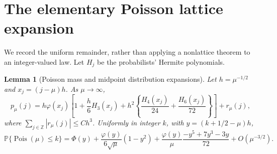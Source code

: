 \documentclass[11pt]{article}
\newcommand{\Pp}{\mathbb P}
\newcommand{\Pois}{\operatorname{Pois}}
\newtheorem{lemma}[theorem]{Lemma}
\theoremstyle{remark}
\begin{document}
\section{The elementary Poisson lattice expansion}\label{sec:lattice}
We record the uniform remainder, rather than applying a nonlattice theorem to an integer-valued law. Let $H_j$ be the probabilists' Hermite polynomials.
\begin{lemma}[Poisson mass and midpoint distribution expansions]\label{lem:poisson-lattice}
Let $h=\mu^{-1/2}$ and $x_j=(j-\mu)h$. As $\mu\to\infty$,
\begin{equation}\label{eq:mass-expansion}
 p_\mu(j)=h\varphi(x_j)\left[1+\frac h6H_3(x_j)
 +h^2\left\{\frac{H_4(x_j)}{24}+\frac{H_6(x_j)}{72}\right\}\right]+r_\mu(j),
\end{equation}
where $\sum_{j\in\mathbb Z}|r_\mu(j)|\le Ch^3$. Uniformly in integer $k$, with $y=(k+1/2-\mu)h$,
\begin{equation}\label{eq:poisson-midpoint}
 \Pp\{\Pois(\mu)\le k\}=\Phi(y)
 +\frac{\varphi(y)}{6\sqrt\mu}(1-y^2)
 +\frac{\varphi(y)}\mu\frac{-y^5+7y^3-3y}{72}
 +O(\mu^{-3/2}).
\end{equation}
\end{lemma}
\end{document}
